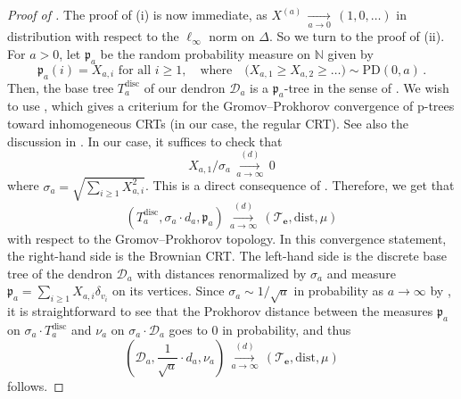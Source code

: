 \documentclass{article}
\theoremstyle{remark}
\newcommand{\bN}{\mathbb{N}}
\newcommand{\cv}[1]{\,\underset{#1}{\longrightarrow}\,}
\newcommand{\dist}{\mathrm{dist}}
\newcommand{\cT}{\mathcal{T}}
\newcommand{\cD}{\mathcal{D}}
\newcommand{\be}{\mathbf{e}}
\newcommand{\PoissonDirichlet}[2]{\mathrm{PD}{\left(#1,#2\right)}}
\newcommand{\fp}{{\mathfrak{p}}}
\DeclareMathOperator{\discrete}{disc}
\begin{document}
\begin{proof}[Proof of ]
The proof of (i) is now immediate, as $X^{(a)} \cv{a\to0} (1,0,\ldots)$ in distribution with respect to the $\ell_\infty$ norm on $\Delta$. 
So we turn to the proof of (ii).
    For $a>0$, let $\fp_a$ be the random probability measure on $\bN$ given by
    \[
        \fp_a(i) = X_{a,i} \text{ for all } i\ge1,
        \quad\text{where}\quad
        \big( X_{a,1} \ge X_{a,2} \ge \dots \big) \sim \PoissonDirichlet{0}{a} \,.
    \]
    Then, the base tree $T_a^{\discrete}$ of our dendron $\cD_a$ is a $\fp_a$-tree in the sense of \cite{Camarri_Pitman_2000,Blanc-Renaudie_2025}.
    We wish to use \cite[Theorem~6.2]{Blanc-Renaudie_2025}, which gives a criterium for the Gromov--Prokhorov convergence of p-trees toward inhomogeneous CRTs (in our case, the regular CRT).
    See also the discussion in \cite[Section~5]{Camarri_Pitman_2000}.
    In our case, it suffices to check that
    \begin{equation*}
        X_{a,1} / \sigma_a \overset{(d)}{\cv{a\to\infty}} 0
    \end{equation*}
    where $\sigma_a = \sqrt{\sum_{i\ge1} X_{a,i}^2}$.
    This is a direct consequence of .
    Therefore, we get that 
    \begin{equation*}
        \left( T_a^{\discrete} , {\sigma_a} \cdot d_a , \fp_a \right)
        \overset{(d)}{\cv{a\to\infty}}
        \left( \cT_\be , \dist, \mu \right)
    \end{equation*}
    with respect to the Gromov--Prokhorov topology.
    In this convergence statement, the right-hand side is the Brownian CRT.
    The left-hand side is the discrete base tree of the dendron $\cD_a$ with distances renormalized by $\sigma_a$ and measure $\fp_a = \sum_{i\ge1} X_{a,i} \delta_{v_i}$ on its vertices.
    Since $\sigma_a \sim 1/\sqrt{a}$ in probability as $a\to\infty$ by , it is straightforward to see that the Prokhorov distance between the measures $\fp_a$ on ${\sigma_a} \cdot T_a^{\discrete}$ and $\nu_a$ on $\sigma_a \cdot \cD_a$ goes to $0$ in probability, and thus
    \begin{equation*}
        \left( \cD_a , \frac{1}{\sqrt a} \cdot d_a , \nu_a \right)
        \overset{(d)}{\cv{a\to\infty}}
        \left( \cT_\be , \dist, \mu \right)
    \end{equation*}
    follows.
\end{proof}
\end{document}
